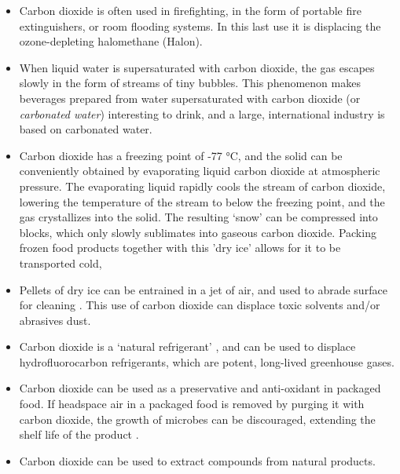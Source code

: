 \begin{itemize}
  
  \item Carbon dioxide is often used in firefighting, in the form of portable
  fire extinguishers, or room flooding systems. In this last use it is
  displacing the ozone-depleting halomethane (Halon).
  
  \item When liquid water is supersaturated with carbon dioxide, the gas
  escapes slowly in the form of streams of tiny bubbles. This phenomenon makes
  beverages prepared from water supersaturated with carbon dioxide (or
  \textit{carbonated water}) interesting to drink, and a large, international
  industry is based on carbonated water.
   
   \item Carbon dioxide has a freezing point of {-}77 °C, and the solid can be
   conveniently obtained by evaporating liquid carbon dioxide at atmospheric
   pressure. The evaporating liquid rapidly cools the stream of carbon dioxide,
   lowering the temperature of the stream to below the freezing point, and the
   gas crystallizes into the solid. The resulting `snow' can be compressed into
   blocks, which only slowly sublimates into gaseous carbon dioxide. Packing
   frozen food products together with this 'dry ice' allows for it to be
   transported cold, 
   
   \item Pellets of dry ice can be entrained in a jet of air, and used to abrade
   surface for cleaning \autocite{Spur1999}. This use of carbon dioxide can
   displace toxic solvents and/or abrasives dust.
   
   \item Carbon dioxide is a `natural refrigerant' \autocite{Pearson2005}, and
   can be used to displace hydrofluorocarbon refrigerants, which are potent,
   long-lived greenhouse gases.
   
   \item Carbon dioxide can be used as a preservative and anti-oxidant in
   packaged food. If headspace air in a packaged food is removed by purging it
   with carbon dioxide, the growth of microbes can be discouraged, extending the
   shelf life of the product \autocite{Jacobsen2002}.
	   
	\item Carbon dioxide can be used to extract compounds from natural products. 
	
\end{itemize}

